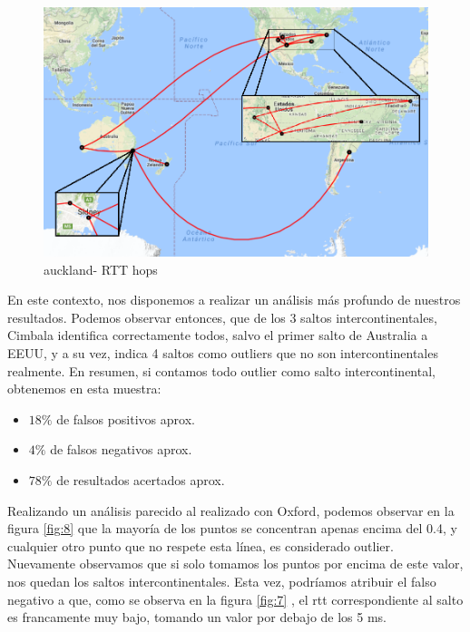\newpage

\begin{figure}[!htbp]
  \centering
    \includegraphics[scale=0.6]{imagenes/auckland-graficos/mapa-auckland.png}
  \caption{auckland- RTT hops}
  \label{mapa-auckland}
\end{figure}

En este contexto, nos disponemos a realizar un análisis más profundo de nuestros resultados. Podemos observar entonces, que de los 3 saltos intercontinentales, Cimbala identifica correctamente todos, salvo el primer salto de Australia a EEUU, y a su vez, indica 4 saltos como outliers que no son intercontinentales realmente. En resumen, si contamos todo outlier como salto intercontinental, obtenemos en esta muestra:

\begin{itemize}
	\item $18 \% $ de falsos positivos aprox.
	\item $4 \%$ de falsos negativos aprox.
	\item $78 \%$ de resultados acertados aprox.
\end{itemize}

Realizando un análisis parecido al realizado con Oxford, podemos observar en la figura \ref{fig:8} que la mayoría de los puntos se concentran apenas encima del 0.4, y cualquier otro punto que no respete esta línea, es considerado outlier. Nuevamente observamos que si solo tomamos los puntos por encima de este valor, nos quedan los saltos intercontinentales. Esta vez, podríamos atribuir el falso negativo a que, como se observa en la figura \ref{fig:7} , el rtt correspondiente al salto es francamente muy bajo, tomando un valor por debajo de los 5 ms.

